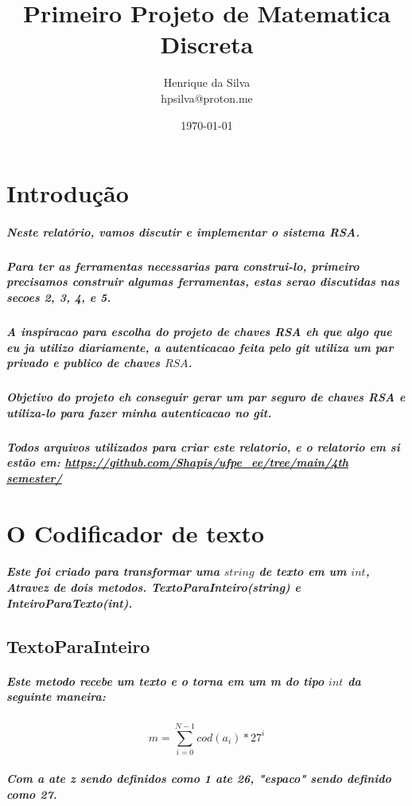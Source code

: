 \documentclass[12pt,twoside, a4paper, twocolumn]{article}
\title{Primeiro Projeto de Matematica Discreta}
\author{Henrique da Silva \\ hpsilva@proton.me}
\date{\today}
\begin{document}
\maketitle
{}
\newpage
\tableofcontents
\newpage



\section{Introdução}


\subparagraph*{Neste relatório, vamos discutir e implementar o sistema RSA.}

\subparagraph*{Para ter as ferramentas necessarias para construi-lo, primeiro precisamos construir algumas ferramentas, estas serao discutidas nas secoes 2, 3, 4, e 5.}

\subparagraph*{A inspiracao para escolha do projeto de chaves RSA eh que algo que eu ja utilizo diariamente, a autenticacao feita pelo \emph{git} utiliza um par privado e publico de chaves $RSA$. }

\subparagraph*{Objetivo do projeto eh conseguir gerar um par seguro de chaves \emph{RSA} e utiliza-lo para fazer minha autenticacao no \emph{git}.}

\subparagraph*{Todos arquivos utilizados para criar este relatorio, e o relatorio em si estão em:  \url{https://github.com/Shapis/ufpe_ee/tree/main/4th semester/}}

\section{O Codificador de texto}

\subparagraph*{Este foi criado para transformar uma $string$ de texto em um $int$, Atravez de dois metodos. TextoParaInteiro(string) e InteiroParaTexto(int). }

\subsection{TextoParaInteiro}

\subparagraph*{Este metodo recebe um texto e o torna em um m do tipo $int$ da seguinte maneira:}

\begin{equation}
    m = \sum_{i=0}^{N - 1} cod(a_i)*27^i
\end{equation}

\subparagraph*{Com \emph{a} ate \emph{z} sendo definidos como 1 ate 26, "espaco" sendo definido como 27.}
\end{document}

